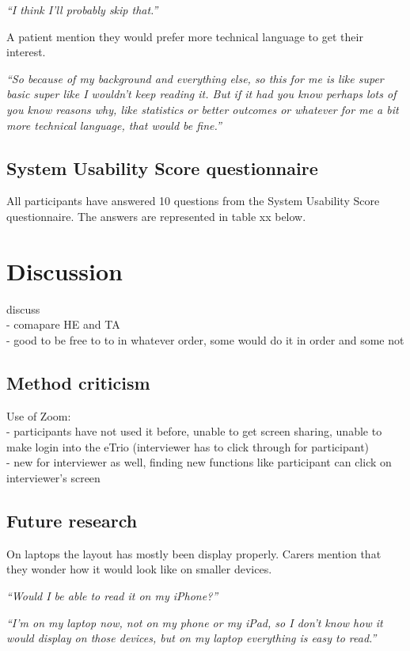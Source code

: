 \documentclass{sigchi}
\begin{document}
\textit{“I think I’ll probably skip that.”}

A patient mention they would prefer more technical language to get their interest.

\textit{“So because of my background and everything else, so this for me is like super basic super like I wouldn’t keep reading it. But if it had you know perhaps lots of you know reasons why, like statistics or better outcomes or whatever for me a bit more technical language, that would be fine.”}

\subsection{System Usability Score questionnaire}
All participants have answered 10 questions from the System Usability Score questionnaire. The answers are represented in table xx below. 

\section{Discussion}
discuss \\
- comapare HE and TA \\
- good to be free to to in whatever order, some would do it in order and some not \\

\subsection{Method criticism}
Use of Zoom:\\
- participants have not used it before, unable to get screen sharing, unable to make login into the eTrio (interviewer has to click through for participant)\\
- new for interviewer as well, finding new functions like participant can click on interviewer's screen

\subsection{Future research}
On laptops the layout has mostly been display properly. Carers mention that they wonder how it would look like on smaller devices. 

\textit{“Would I be able to read it on my iPhone?”}

\textit{“I’m on my laptop now, not on my phone or my iPad, so I don’t know how it would display on those devices, but on my laptop everything is easy to read.”}
\end{document}
